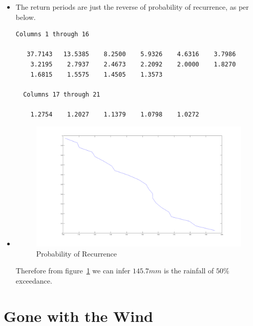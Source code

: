 \documentclass[12pt]{article}
\begin{document}
\begin{itemize}
\begin{verbatim}
  Columns 1 through 16

    0.0265    0.0739    0.1212    0.1686    0.2159    0.2633
    0.3106    0.3580    0.4053    0.4527    0.5000    0.5473
    0.5947    0.6420    0.6894    0.7367

  Columns 17 through 21

    0.7841    0.8314    0.8788    0.9261    0.9735

\end{verbatim}
\item The return periods are just the reverse of probability of
  recurrence, as per below.
\begin{verbatim}
Columns 1 through 16

   37.7143   13.5385    8.2500    5.9326    4.6316    3.7986
    3.2195    2.7937    2.4673    2.2092    2.0000    1.8270
    1.6815    1.5575    1.4505    1.3573

  Columns 17 through 21

    1.2754    1.2027    1.1379    1.0798    1.0272
\end{verbatim}
\item 
  \begin{figure}
    \centering
    \includegraphics[angle=90,scale=0.4]{rain2}
    \caption{Probability of Recurrence}
    \label{fig:prob-recur}
  \end{figure}
  Therefore from figure~\ref{fig:prob-recur} we can infer $145.7mm$ is
  the rainfall of $50\%$ exceedance.
\end{itemize}

\section{Gone with the Wind}
\label{sec:it-there.-air}
\end{document}
